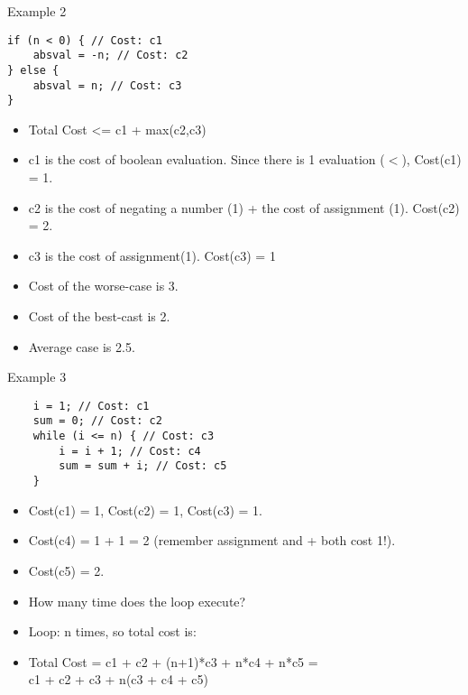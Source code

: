 \documentclass{beamer}
\begin{document}
\begin{frame}[fragile]{Example 2}
\begin{lstlisting}
if (n < 0) { // Cost: c1
    absval = -n; // Cost: c2
} else {
    absval = n; // Cost: c3
}

\end{lstlisting}
\begin{itemize}
\item Total Cost  <=  c1 + max(c2,c3)
\item c1 is the cost of boolean evaluation.  Since there is 1 evaluation ($<$), Cost(c1) = 1.
\item c2 is the cost of negating a number (1) + the cost of assignment (1).  Cost(c2) = 2.
\item c3 is the cost of assignment(1).  Cost(c3) = 1
\item Cost of the worse-case is 3.
\item Cost of the best-cast is 2.
\item Average case is 2.5.
\end{itemize}
\end{frame}

\begin{frame}[fragile]{Example 3}
\begin{lstlisting}
    i = 1; // Cost: c1
    sum = 0; // Cost: c2
    while (i <= n) { // Cost: c3
        i = i + 1; // Cost: c4
        sum = sum + i; // Cost: c5
    } 
\end{lstlisting}
\begin{itemize}
\item <2-> Cost(c1) = 1, Cost(c2) = 1, Cost(c3) = 1.
\item <3-> Cost(c4) = 1 + 1 = 2 (remember assignment and + both cost 1!).
\item <4-> Cost(c5) = 2.
\item <5-> How many time does the loop execute?
\item <6-> Loop: n times, so total cost is:
\item <7-> Total Cost = c1 + c2 + (n+1)*c3 + n*c4 + n*c5 = \\
c1 + c2 + c3 + n(c3 + c4 + c5)
\end{itemize}
\end{frame}
\end{document}
